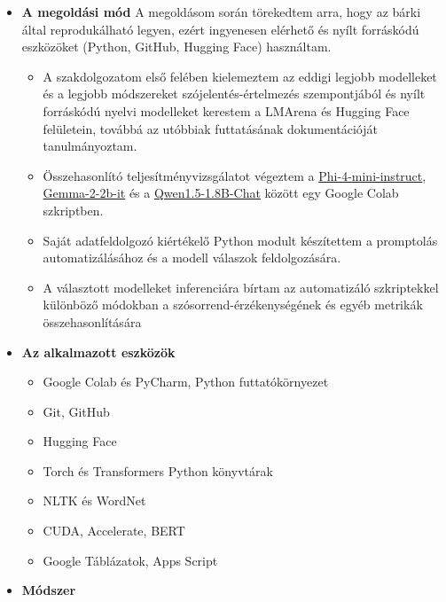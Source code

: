 \documentclass[12pt]{report}
\theoremstyle{definition}
\begin{document}
\begin{itemize}
\item \textbf{A megoldási mód}
    A megoldásom során törekedtem arra, hogy az bárki által reprodukálható legyen, ezért ingyenesen elérhető és nyílt forráskódú eszközöket (Python, GitHub, Hugging Face) használtam.
      \begin{itemize}
        \item
              A szakdolgozatom első felében kielemeztem az eddigi legjobb modelleket és a legjobb módszereket szójelentés-értelmezés szempontjából és nyílt forráskódú nyelvi modelleket kerestem a LMArena és Hugging Face felületein, továbbá az utóbbiak futtatásának dokumentációját tanulmányoztam.
            \item Összehasonlító teljesítményvizsgálatot végeztem a
            \href{https://huggingface.co/microsoft/Phi-4-mini-instruct}{Phi-4-mini-instruct}, \href{https://huggingface.co/google/gemma-2-2b-it}{Gemma-2-2b-it} és a \href{https://huggingface.co/Qwen/Qwen1.5-1.8B-Chat}{Qwen1.5-1.8B-Chat} között egy Google Colab szkriptben.
        \item
              Saját adatfeldolgozó kiértékelő Python modult készítettem a promptolás automatizálásához és a modell válaszok feldolgozására.
        \item A választott modelleket inferenciára bírtam az automatizáló szkriptekkel különböző módokban a szósorrend-érzékenységének és egyéb metrikák összehasonlítására

      \end{itemize}
\item \textbf{Az alkalmazott eszközök}
      \begin{itemize}

        \item Google Colab és PyCharm, Python futtatókörnyezet
        \item Git, GitHub
        \item Hugging Face
        \item Torch és Transformers Python könyvtárak
        \item NLTK és WordNet
        \item CUDA, Accelerate, BERT
        \item Google Táblázatok, Apps Script

      \end{itemize}
      \item \textbf{Módszer}
      \begin{itemize}


\end{itemize}
\end{itemize}
\end{document}

